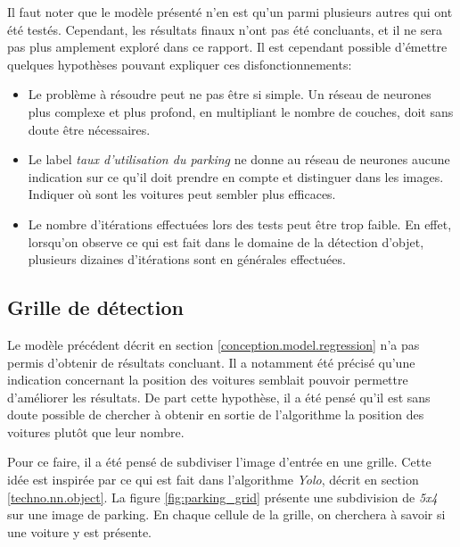 Il faut noter que le modèle présenté n'en est qu'un parmi plusieurs autres qui ont été testés. Cependant, les résultats finaux n'ont pas été concluants, et il ne sera pas plus amplement exploré dans ce rapport. Il est cependant possible d'émettre quelques hypothèses pouvant expliquer ces disfonctionnements:

\begin{itemize}
    \item Le problème à résoudre peut ne pas être si simple. Un réseau de neurones plus complexe et plus profond, en multipliant le nombre de couches, doit sans doute être nécessaires. 
    \item Le label \textit{taux d'utilisation du parking} ne donne au réseau de neurones aucune indication sur ce qu'il doit prendre en compte et distinguer dans les images. Indiquer où sont les voitures peut sembler plus efficaces.
    \item Le nombre d'itérations effectuées lors des tests peut être trop faible. En effet, lorsqu'on observe ce qui est fait dans le domaine de la détection d'objet, plusieurs dizaines d'itérations sont en générales effectuées. 
\end{itemize}

\subsection{Grille de détection} 
Le modèle précédent décrit en section \ref{conception.model.regression} n'a pas permis d'obtenir de résultats concluant. Il a notamment été précisé qu'une indication concernant la position des voitures semblait pouvoir permettre d'améliorer les résultats. De part cette hypothèse, il a été pensé qu'il est sans doute possible de chercher à obtenir en sortie de l'algorithme la position des voitures plutôt que leur nombre.

Pour ce faire, il a été pensé de subdiviser l'image d'entrée en une grille. Cette idée est inspirée par ce qui est fait dans l'algorithme \textit{Yolo}, décrit en section \ref{techno.nn.object}. La figure \ref{fig:parking_grid} présente une subdivision de \textit{5x4} sur une image de parking. En chaque cellule de la grille, on cherchera à savoir si une voiture y est présente. 


